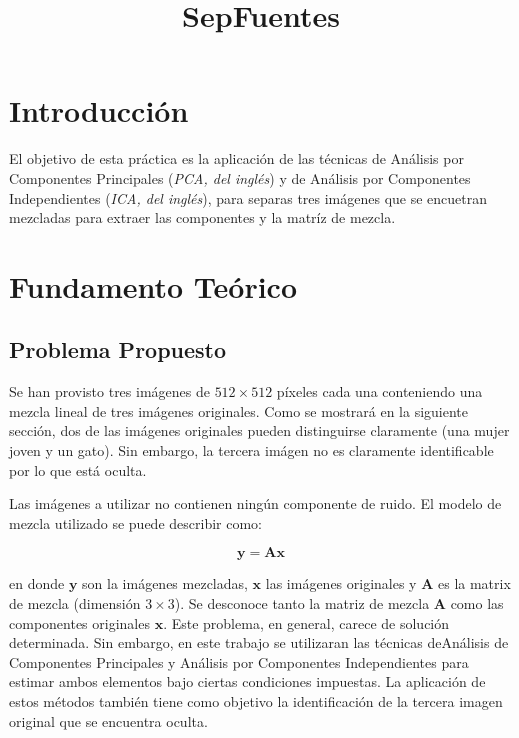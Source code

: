 \documentclass{article}
\title{SepFuentes}
\begin{document}
    
    
    \maketitle
    
    

    

    \section{Introducción}


    El objetivo de esta práctica es la aplicación de las técnicas de
Análisis por Componentes Principales (\emph{PCA, del inglés}) y de
Análisis por Componentes Independientes (\emph{ICA, del inglés}), para
separas tres imágenes que se encuetran mezcladas para extraer las
componentes y la matríz de mezcla.


    \section{Fundamento Teórico}



    \subsection{Problema Propuesto}


    Se han provisto tres imágenes de \(512\times512\) píxeles cada una
conteniendo una mezcla lineal de tres imágenes originales. Como se
mostrará en la siguiente sección, dos de las imágenes originales pueden
distinguirse claramente (una mujer joven y un gato). Sin embargo, la
tercera imágen no es claramente identificable por lo que está oculta.

Las imágenes a utilizar no contienen ningún componente de ruido. El
modelo de mezcla utilizado se puede describir como:

\[ \mathbf{y} = \mathbf{A} \mathbf{x} \]

en donde \(\mathbf{y}\) son la imágenes mezcladas, \(\mathbf{x}\) las
imágenes originales y \(\mathbf{A}\) es la matrix de mezcla (dimensión
\(3\times3\)). Se desconoce tanto la matriz de mezcla \(\mathbf{A}\)
como las componentes originales \(\mathbf{x}\). Este problema, en
general, carece de solución determinada. Sin embargo, en este trabajo se
utilizaran las técnicas deAnálisis de Componentes Principales y Análisis
por Componentes Independientes para estimar ambos elementos bajo ciertas
condiciones impuestas. La aplicación de estos métodos también tiene como
objetivo la identificación de la tercera imagen original que se
encuentra oculta.
\end{document}
